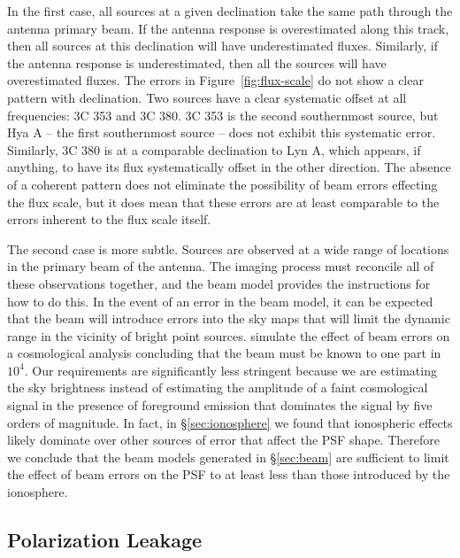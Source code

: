 \documentclass[twocolumn]{aastex61}
\begin{document}
In the first case, all sources at a given declination take the same path through the antenna primary
beam. If the antenna response is overestimated along this track, then all sources at this
declination will have underestimated fluxes. Similarly, if the antenna response is underestimated,
then all the sources will have overestimated fluxes. The errors in Figure~\ref{fig:flux-scale} do
not show a clear pattern with declination. Two sources have a clear systematic offset at all
frequencies: 3C 353 and 3C 380. 3C 353 is the second southernmost source, but Hya A -- the first
southernmost source -- does not exhibit this systematic error. Similarly, 3C 380 is at a comparable
declination to Lyn A, which appears, if anything, to have its flux systematically offset in the
other direction. The absence of a coherent pattern does not eliminate the possibility of beam errors
effecting the flux scale, but it does mean that these errors are at least comparable to the errors
inherent to the flux scale itself.

The second case is more subtle. Sources are observed at a wide range of locations in the primary
beam of the antenna. The imaging process must reconcile all of these observations together, and the
beam model provides the instructions for how to do this. In the event of an error in the beam model,
it can be expected that the beam will introduce errors into the sky maps that will limit the dynamic
range in the vicinity of bright point sources.  \citet{2015PhRvD..91h3514S} simulate the effect of
beam errors on a cosmological analysis concluding that the beam must be known to one part in $10^4$.
Our requirements are significantly less stringent because we are estimating the sky brightness
instead of estimating the amplitude of a faint cosmological signal in the presence of foreground
emission that dominates the signal by five orders of magnitude. In fact, in \S\ref{sec:ionosphere}
we found that ionospheric effects likely dominate over other sources of error that affect the PSF
shape. Therefore we conclude that the beam models generated in \S\ref{sec:beam} are sufficient to
limit the effect of beam errors on the PSF to at least less than those introduced by the ionosphere.

\subsection{Polarization Leakage}
\end{document}
